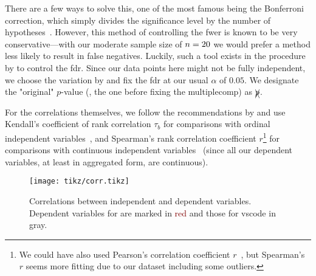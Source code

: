 \documentclass[../thesis]{subfiles}
\begin{document}
There are a few ways to solve this, one of the most famous being the Bonferroni correction, which simply divides the significance level by the number of hypotheses~\cite[66 \psq]{miller1981}.
However, this method of controlling the \gls{fwer} is known to be very conservative---with our moderate sample size of $n=20$ we would prefer a method less likely to result in false negatives.
Luckily, such a tool exists in the procedure by \textcite{benjamini1995} to control the \gls{fdr}.
Since our data points here might not be fully independent, we choose the variation by \textcite{benjamini2001} and fix the \gls{fdr} at our usual $\alpha$ of $0.05$.
We designate the "original" $p$-value (\ie, the one before fixing the \gls{multiplecomp}) as $\xcancel{p}$.

For the correlations themselves, we follow the recommendations by \textcite[157,159]{khamis2008} and use Kendall's coefficient of rank correlation $\tau_b$ for comparisons with ordinal independent variables~\cite{kendall1938, kendall1945}, and Spearman's rank correlation coefficient $r$\footnote{
	We could have also used Pearson's correlation coefficient $r$~\cite{bravais1844, pearson1895}, but Spearman's $r$ seems more fitting due to our dataset including some outliers.
} for comparisons with continuous independent variables~\cite{spearman1904} (since all our dependent variables, at least in aggregated form, are continuous).

\begin{figure}
	\centering
	\texttt{[image: tikz/corr.tikz]}
	\caption{Correlations between independent and dependent variables.\\
		Dependent variables for \SEE{} are marked in \textcolor{Maroon}{red} and those for \gls{vscode} in \textcolor{Gray!50!black}{gray}.}\label{fig:corr}
\end{figure}
\end{document}
